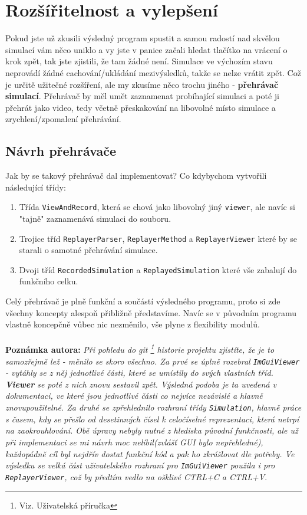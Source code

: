 \chapter{Rozšířitelnost a vylepšení}

Pokud jste už zkusili výsledný program spustit a samou radostí nad skvělou simulací vám něco uniklo a vy jste v panice začali hledat tlačítko na vrácení o krok zpět, tak jste zjistili, že tam žádné není. Simulace ve výchozím stavu neprovádí žádné cachování/ukládání mezivýsledků, takže se nelze vrátit zpět. Což je určitě užitečné rozšíření, ale my zkusíme něco trochu jiného - \textbf{přehrávač simulací}.
Přehrávač by měl umět zaznamenat probíhající simulaci a poté ji přehrát jako video, tedy včetně přeskakování na libovolné místo simulace a zrychlení/zpomalení přehrávání.

\section{Návrh přehrávače}
Jak by se takový přehrávač dal implementovat?
Co kdybychom vytvořili následující třídy:
\begin{enumerate}
	\item Třída \texttt{ViewAndRecord}, která se chová jako libovolný jiný \texttt{viewer}, ale navíc si "tajně" zaznamenává simulaci do souboru. 
	\item Trojice tříd \texttt{ReplayerParser}, \texttt{ReplayerMethod} a \texttt{ReplayerViewer} které by se starali o samotné přehrávání simulace.
	\item Dvoji tříd \texttt{RecordedSimulation} a \texttt{ReplayedSimulation} které vše zabalují do funkčního celku.
\end{enumerate}
Celý přehrávač je plně funkční a součástí výsledného programu, proto si zde všechny koncepty alespoň přibližně představíme.
Navíc se v původním programu vlastně koncepčně vůbec nic nezměnilo, vše plyne z flexibility modulů.
\\
\\
\textbf{Poznámka autora:}  \textit{Při pohledu do git
	\footnote{Viz. Uživatelská příručka}
historie projektu zjistíte, že je to samozřejmě lež - měnilo se skoro všechno. Za prvé se úplně rozebral \texttt{ImGuiViewer} - vytáhly se z něj jednotlivé části, které se umístily do svých vlastních tříd. \textbf{Viewer} se poté z nich znovu sestavil zpět. Výsledná podoba je ta uvedená v dokumentaci, ve které jsou jednotlivé části co nejvíce nezávislé a hlavně znovupoužitelné.
Za druhé se zpřehlednilo rozhraní třídy \texttt{Simulation}, hlavně práce s časem, kdy se přešlo od desetinných čísel k celočíselné reprezentaci, která netrpí na zaokrouhlování.
Obě úpravy nebyly nutné z hlediska původní funkčnosti, ale už při implementaci se mi návrh moc nelíbil(zvlášť GUI bylo nepřehledné), každopádně cíl byl nejdřív dostat funkční kód a pak ho zkrášlovat dle potřeby.
Ve výsledku se velká část uživatelského rozhraní pro \texttt{ImGuiViewer} použila i pro \texttt{ReplayerViewer}, což by předtím vedlo na ošklivé {\small CTRL+C a  CTRL+V}}.


